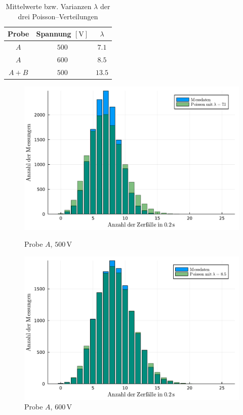 \documentclass[12pt,a4paper]{scrartcl}
\numberwithin{equation}{section} %
\begin{document}
\begin{table}[h!]
	\centering
	\begin{tabular}{c|c|c}
		Probe & Spannung $[\mathrm{V}]$ & $\lambda$ \\
		\hline
		$A$ & $500$ & $7.1$ \\
		$A$ & $600$ & $8.5$ \\
		$A+B$ & $500$ & $13.5$ \\
	\end{tabular}
	\caption{Mittelwerte bzw. Varianzen $\lambda$  der drei Poisson--Verteilungen}
	\label{table:poisson}
\end{table}

\begin{figure}
	\centering
	\begin{minipage}{0.49\textwidth}
		\centering
		\includegraphics[width=\textwidth]{../media/B3.1/poisson1.pdf}
		\caption*{Probe $A$, $500 \mathrm{\, V}$}
	\end{minipage}
	\begin{minipage}{0.49\textwidth}
		\centering
		\includegraphics[width=\textwidth]{../media/B3.1/poisson2.pdf}
		\caption*{Probe $A$, $600 \mathrm{\, V}$}
	\end{minipage}
	\vspace{3pt}


\end{figure}
\end{document}
